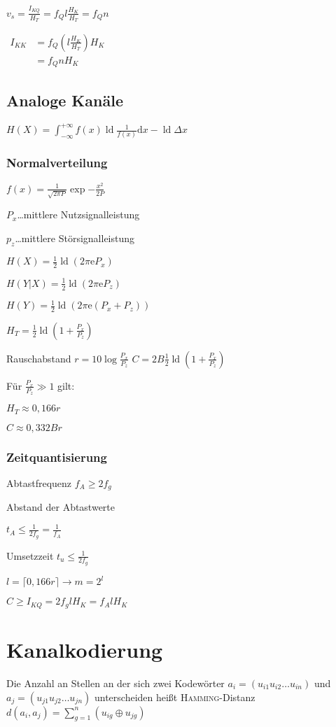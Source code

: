 \documentclass[8pt,a4paper,landscape]{extarticle}
\DeclareMathOperator*{\ld}{ld}
\begin{document}
\begin{multicols*}{6}
$\boxed{v_s = \frac{I_{KQ}}{H_T} = f_Q l \frac{H_K}{H_T} = f_Q n}$

$\boxed{
\begin{aligned}
	I_{KK}	&= f_Q \left( l \frac{H_K}{H_T} \right) H_K  \\
		&= f_Q n H_K
\end{aligned}}$

\subsection{Analoge Kanäle}
$H(X) = \int_{-\infty}^{+\infty} f(x) \ld \frac{1}{f(x)} \mathrm{d}x - \ld \Delta x$

\subsubsection{Normalverteilung}
$f(x) = \frac{1}{\sqrt{2\pi P}} \exp{-\frac{x^2}{2 P}}$

$P_x$\dots{}mittlere Nutzsignalleistung

$p_z$\dots{}mittlere Störsignalleistung

$H(X) = \frac{1}{2} \ld (2 \pi \mathrm{e} P_x)$

$H(Y|X) = \frac{1}{2} \ld (2 \pi \mathrm{e} P_z)$

$H(Y) = \frac{1}{2} \ld (2 \pi \mathrm{e} (P_x + P_z))$

$H_T = \frac{1}{2} \ld \left(1 + \frac{P_x}{P_z} \right)$

Rauschabstand $r = 10 \log \frac{P_x}{P_z}$ $C = 2 B \frac{1}{2} \ld \left(1 + \frac{P_x}{P_z} \right)$

Für $\frac{P_x}{P_z} \gg 1$ gilt:

$\boxed{H_T \approx 0,166 r}$

$\boxed{C \approx 0,332 B r}$

\subsubsection{Zeitquantisierung}
Abtastfrequenz $\boxed{f_A \ge 2 f_g}$

Abstand der Abtastwerte

$\boxed{t_A \le \frac{1}{2 f_g} = \frac{1}{f_A}}$

Umsetzzeit $t_u \le \frac{1}{2 f_g}$

$l = \lceil 0,166 r \rceil \rightarrow m = 2^l$

$C \ge I_{KQ} = 2 f_g l H_K = f_A l H_K$

\section{Kanalkodierung}
Die Anzahl an Stellen an der sich zwei Kodewörter $a_i = (u_{i1}u_{i2}\dots{}u_{in})$ und $a_j = (u_{j1}u_{j2}\dots{}u_{jn})$
unterscheiden heißt \textsc{Hamming}-Distanz $d(a_i, a_j) = \sum_{g=1}^n (u_{ig} \oplus u_{jg})$


\end{multicols*}
\end{document}

